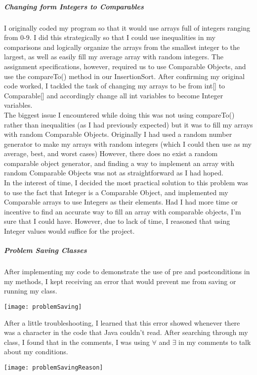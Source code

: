 \documentclass[12pt]{article}
\begin{document}
\subparagraph{Changing form Integers to Comparables}
I originally coded my program so that it would use arrays full of integers ranging from 0-9. I did this strategically so that I could use inequalities in my comparisons and logically organize the arrays from the smallest integer to the largest, as well as easily fill my average array with random integers. The assignment specifications, however, required us to use Comparable Objects, and use the compareTo() method in our InsertionSort. After confirming my original code worked, I tackled the task of changing my arrays to be from int[] to Comparable[] and accordingly change all int variables to become Integer variables. \\
The biggest issue I encountered while doing this was not using compareTo() rather than inequalities (as I had previously expected) but it was to fill my arrays with random Comparable Objects. Originally I had used a random number generator to make my arrays with random integers (which I could then use as my average, best, and worst cases)  However, there does no exist a random comparable object generator, and finding a way to implement an array with random Comparable Objects was not as straightforward as I had hoped. \\
In the interest of time, I decided the most practical solution to this problem was to use the fact that Integer is a Comparable Object, and implemented my Comparable arrays to use Integers as their elements. Had I had more time or incentive to find an accurate way to fill an array with comparable objects, I'm sure that I could have. However, due to lack of time, I reasoned that using Integer values would suffice for the project.

\subparagraph{Problem Saving Classes}
After implementing my code to demonstrate the use of pre and postconditions in my methods, I kept receiving an error that would prevent me from saving or running my class. 

\vspace*{.5in}
\texttt{[image: problemSaving]}
\vspace*{.5in}

After a little troubleshooting, I learned that this error showed whenever there was a character in the code that Java couldn't read. After searching through my class, I found that in the comments, I was using $\forall$ and $\exists$ in my comments to talk about my conditions. 

\vspace*{.5in}
\texttt{[image: problemSavingReason]}
\vspace*{.5in}
\end{document}

